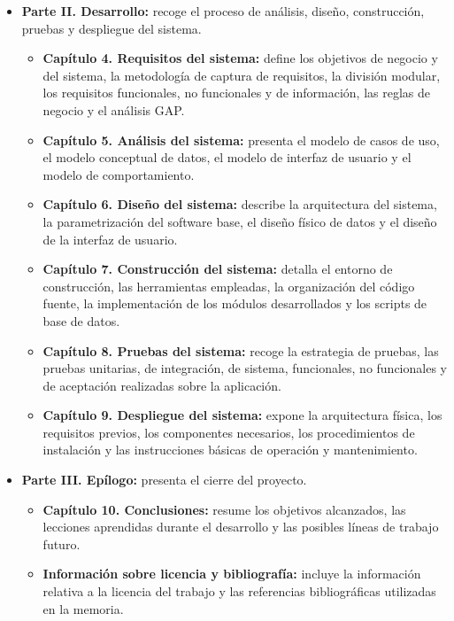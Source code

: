 \begin{itemize}
    \item \textbf{Parte II. Desarrollo:} recoge el proceso de análisis, diseño, construcción, pruebas y despliegue del sistema.
          \begin{itemize}
              \item \textbf{Capítulo 4. Requisitos del sistema:} define los objetivos de negocio y del sistema, la metodología de captura de requisitos, la división modular, los requisitos funcionales, no funcionales y de información, las reglas de negocio y el análisis GAP.
              \item \textbf{Capítulo 5. Análisis del sistema:} presenta el modelo de casos de uso, el modelo conceptual de datos, el modelo de interfaz de usuario y el modelo de comportamiento.
              \item \textbf{Capítulo 6. Diseño del sistema:} describe la arquitectura del sistema, la parametrización del software base, el diseño físico de datos y el diseño de la interfaz de usuario.
              \item \textbf{Capítulo 7. Construcción del sistema:} detalla el entorno de construcción, las herramientas empleadas, la organización del código fuente, la implementación de los módulos desarrollados y los scripts de base de datos.
              \item \textbf{Capítulo 8. Pruebas del sistema:} recoge la estrategia de pruebas, las pruebas unitarias, de integración, de sistema, funcionales, no funcionales y de aceptación realizadas sobre la aplicación.
              \item \textbf{Capítulo 9. Despliegue del sistema:} expone la arquitectura física, los requisitos previos, los componentes necesarios, los procedimientos de instalación y las instrucciones básicas de operación y mantenimiento.
          \end{itemize}

    \item \textbf{Parte III. Epílogo:} presenta el cierre del proyecto.
          \begin{itemize}
              \item \textbf{Capítulo 10. Conclusiones:} resume los objetivos alcanzados, las lecciones aprendidas durante el desarrollo y las posibles líneas de trabajo futuro.
              \item \textbf{Información sobre licencia y bibliografía:} incluye la información relativa a la licencia del trabajo y las referencias bibliográficas utilizadas en la memoria.
          \end{itemize}


\end{itemize}
